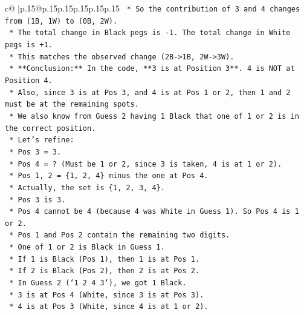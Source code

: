 \documentclass{article}
\begin{document}
{\begin{supertabular}{c@{$\;$}|p{.15\linewidth}@{}p{.15\linewidth}p{.15\linewidth}p{.15\linewidth}p{.15\linewidth}p{.15\linewidth}}
{{{\texttt{                    *   So the contribution of 3 and 4 changes from (1B, 1W) to (0B, 2W).} \\
\texttt{                    *   The total change in Black pegs is {-}1. The total change in White pegs is +1.} \\
\texttt{                    *   This matches the observed change (2B{-}>1B, 2W{-}>3W).} \\
\texttt{                    *   **Conclusion:** In the code, **3 is at Position 3**. 4 is NOT at Position 4.} \\
\texttt{                    *   Also, since 3 is at Pos 3, and 4 is at Pos 1 or 2, then 1 and 2 must be at the remaining spots.} \\
\texttt{                    *   We also know from Guess 2 having 1 Black that one of 1 or 2 is in the correct position.} \\
\texttt{                    *   Let's refine:} \\
\texttt{                        *   Pos 3 = 3.} \\
\texttt{                        *   Pos 4 = ? (Must be 1 or 2, since 3 is taken, 4 is at 1 or 2).} \\
\texttt{                        *   Pos 1, 2 = \{1, 2, 4\} minus the one at Pos 4.} \\
\texttt{                        *   Actually, the set is \{1, 2, 3, 4\}.} \\
\texttt{                        *   Pos 3 is 3.} \\
\texttt{                        *   Pos 4 cannot be 4 (because 4 was White in Guess 1). So Pos 4 is 1 or 2.} \\
\texttt{                        *   Pos 1 and Pos 2 contain the remaining two digits.} \\
\texttt{                        *   One of 1 or 2 is Black in Guess 1.} \\
\texttt{                            *   If 1 is Black (Pos 1), then 1 is at Pos 1.} \\
\texttt{                            *   If 2 is Black (Pos 2), then 2 is at Pos 2.} \\
\texttt{                        *   In Guess 2 (`1 2 4 3`), we got 1 Black.} \\
\texttt{                            *   3 is at Pos 4 (White, since 3 is at Pos 3).} \\
\texttt{                            *   4 is at Pos 3 (White, since 4 is at 1 or 2).} \\
}}}
\end{supertabular}}
\end{document}
